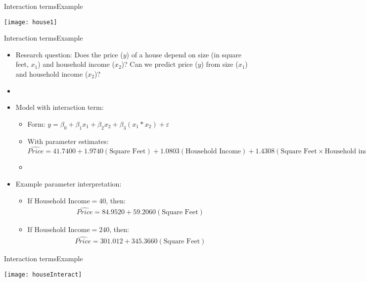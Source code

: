 \documentclass[xcolor=dvipsnames]{beamer}
\begin{document}
\begin{frame}{Interaction terms}{Example}
	\begin{center}
		\texttt{[image: house1]}
	\end{center}
\end{frame}

\begin{frame}{Interaction terms}{Example}
	\begin{itemize}
		\item Research question: Does the price ($y$) of a house depend on size (in square feet, $x_1$) and household income ($x_2$)? Can we predict price ($y$) from size ($x_1$) and household income ($x_2$)?
		\item[]
		\item Model with interaction term: \pause
		\begin{itemize}
			\item Form: $y = \beta_0 + \beta_1 x_1 + \beta_2 x_2 + \beta_3 (x_1 * x_2) + \varepsilon$ \pause
			\item With parameter estimates: $\hat{Price} = 41.7400 + 1.9740 (\text{Square Feet}) + 1.0803 (\text{Household Income})+ 1.4308 (\text{Square Feet}\times \text{Household income}) $ \pause
			\item[]
		\end{itemize}
	\item Example parameter interpretation: \pause
	\begin{itemize}
		\item If $\text{Household Income} = 40$, then: \pause
		\begin{align*}
			\hat{Price} = 84.9520 + 59.2060 (\text{Square Feet}) 
		\end{align*} \pause
		\item If $\text{Household Income} = 240$, then: \pause
		\begin{align*}
		\hat{Price} = 301.012 + 345.3660 (\text{Square Feet}) 
		\end{align*}
	\end{itemize}
	\end{itemize}
\end{frame}

\begin{frame}{Interaction terms}{Example}
	\begin{center}
		\texttt{[image: houseInteract]}
	\end{center}
\end{frame}
\end{document}
